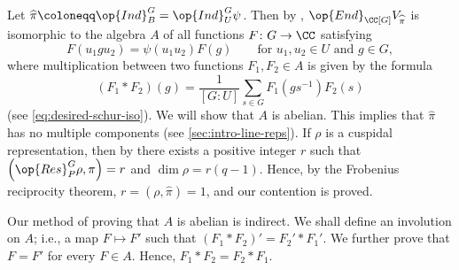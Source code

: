 \documentclass[../main.tex]{subfiles}
\begin{document}
Let $\widehat\pi\coloneqq\op{Ind}^G_B=\op{Ind}^G_U\psi$. Then by , $\op{End}_{\CC[G]}V_{\widehat\pi}$ is isomorphic to the algebra $A$ of all functions $F\colon G\to\CC$ satisfying
\[F(u_1gu_2)=\psi(u_1u_2)F(g)\qquad\text{for }u_1,u_2\in U\text{ and }g\in G,\]
where multiplication between two functions $F_1,F_2\in A$ is given by the formula
\[(F_1*F_2)(g)=\frac1{[G:U]}\sum_{s\in G}F_1\left(gs^{-1}\right)F_2(s)\]
(see \eqref{eq:desired-schur-iso}). We will show that $A$ is abelian. This implies that $\widehat\pi$ has no multiple components (see \cref{sec:intro-line-reps}). If $\rho$ is a cuspidal representation, then by  there exists a positive integer $r$ such that $\left(\op{Res}^G_P\rho,\pi\right)=r$ and $\dim\rho=r(q-1)$. Hence, by the Frobenius reciprocity theorem, $r=(\rho,\widehat\pi)=1$, and our contention is proved.

Our method of proving that $A$ is abelian is indirect. We shall define an involution on $A$; i.e., a map $F\mapsto F'$ such that $(F_1*F_2)'=F_2'*F_1'$. We further prove that $F=F'$ for every $F\in A$. Hence, $F_1*F_2=F_2*F_1$.
\end{document}
